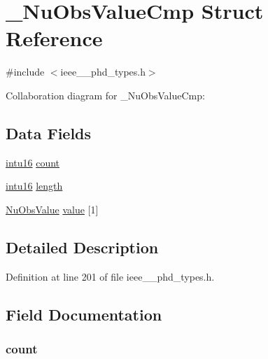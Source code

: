 \hypertarget{struct___nu_obs_value_cmp}{}\section{\+\_\+\+Nu\+Obs\+Value\+Cmp Struct Reference}
\label{struct___nu_obs_value_cmp}


{\ttfamily \#include $<$ieee\+\_\+\_\+phd\+\_\+types.\+h$>$}



Collaboration diagram for \+\_\+\+Nu\+Obs\+Value\+Cmp\+:
\subsection*{Data Fields}
\begin{DoxyCompactItemize}
\item 
\hyperlink{ieee__11073__phd__types_8h_a3561595d2aa7416532e1c9910abd076d}{intu16} \hyperlink{struct___nu_obs_value_cmp_abf6db060ae8e224764b0f867fb135ecd}{count}
\item 
\hyperlink{ieee__11073__phd__types_8h_a3561595d2aa7416532e1c9910abd076d}{intu16} \hyperlink{struct___nu_obs_value_cmp_a3743679e4ff85e3e1b3fc2e59973fbb3}{length}
\item 
\hyperlink{ieee__11073__phd__types_8h_aabf7d4cdd7c242e7e870b15feb24c3cc}{Nu\+Obs\+Value} \hyperlink{struct___nu_obs_value_cmp_af92a9ff5f6c619206de03f520ebb5bd0}{value} \mbox{[}1\mbox{]}
\end{DoxyCompactItemize}


\subsection{Detailed Description}


Definition at line 201 of file ieee\+\_\+\_\+phd\+\_\+types.\+h.



\subsection{Field Documentation}
\hypertarget{struct___nu_obs_value_cmp_abf6db060ae8e224764b0f867fb135ecd}{}
\subsubsection[{count}]{ count}\label{struct___nu_obs_value_cmp_abf6db060ae8e224764b0f867fb135ecd}


